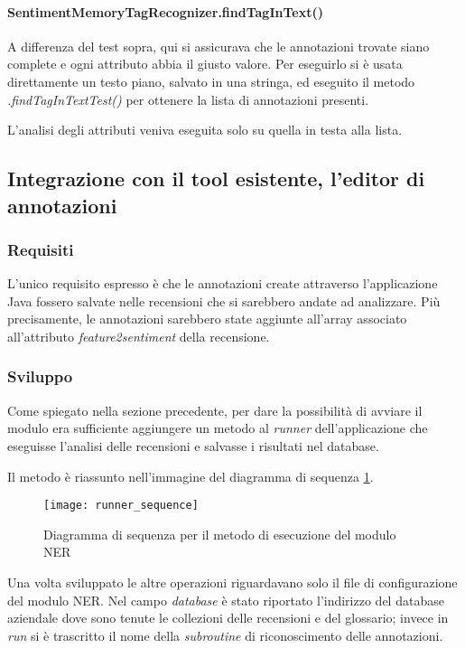\paragraph{SentimentMemoryTagRecognizer.findTagInText()}
A differenza del test sopra, qui si assicurava che le annotazioni trovate
siano complete e ogni attributo abbia il giusto valore. Per eseguirlo si è
usata direttamente un testo piano, salvato in una stringa, ed eseguito il metodo
\textit{.findTagInTextTest()} per ottenere la lista di annotazioni presenti.

L'analisi degli attributi veniva eseguita solo su quella in testa alla lista.

\subsection{Integrazione con il tool esistente, l'editor di annotazioni}
\subsubsection{Requisiti}
L'unico requisito espresso è che le annotazioni create attraverso l'applicazione
Java fossero salvate nelle recensioni che si sarebbero andate ad analizzare.
Più precisamente, le annotazioni sarebbero state aggiunte all'array associato
all'attributo \textit{feature2sentiment} della recensione.

\subsubsection{Sviluppo}
Come spiegato nella sezione precedente, per dare la possibilità di avviare il
modulo era sufficiente aggiungere un metodo al \textit{runner} dell'applicazione
che eseguisse l'analisi delle recensioni e salvasse i risultati nel database.

Il metodo è riassunto nell'immagine del diagramma di sequenza
\ref{fig:runner_sequence}.

\begin{figure}[t]
\begin{center}
\texttt{[image: runner\_sequence]}
\caption{
Diagramma di sequenza per il metodo di esecuzione del modulo NER
}
\label{fig:runner_sequence}
\end{center}
\end{figure}

Una volta sviluppato le altre operazioni riguardavano solo il file di
configurazione del modulo \gls{NER}. Nel campo \textit{database} è stato
riportato l'indirizzo del database aziendale dove sono tenute le collezioni
delle recensioni e del glossario; invece in \textit{run} si è trascritto il nome
della \textit{subroutine} di riconoscimento delle annotazioni.

